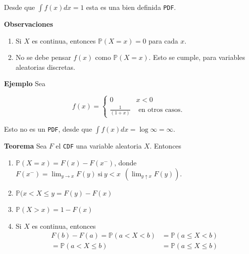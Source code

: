 \documentclass{article}\usepackage[]{graphicx}\usepackage[]{color}
\begin{document}
\vspace{0.2cm}

Desde que $\int f(x)dx = 1$ esta es una bien definida \texttt{PDF}.

\vspace{0.3cm}


\textbf{Observaciones}

\vspace{0.2cm}

\begin{enumerate}
\item Si $X$ es continua, entonces $\mathbb{P}(X =x) = 0$ para cada $x$. 
\item No se debe pensar $f(x)$ como $\mathbb{P}(X=x)$. Esto se cumple, para variables aleatorias discretas.
\end{enumerate}

\vspace{0.3cm}

\textbf{Ejemplo} Sea 

\[
f(x) = \begin{cases}
0 & x < 0\\
\frac{1}{(1 + x)} & \mbox{ en otros casos.}
\end{cases}
\]

\vspace{0.2cm}

Esto no es un \texttt{PDF}, desde que $\int f(x)dx = \log \infty = \infty$.

\vspace{0.3cm}

\textbf{Teorema} Sea $F$ el \texttt{CDF} una variable aleatoria $X$. Entonces

\begin{enumerate}
\item $\mathbb{P}(X =x) = F(x) - F(x^{-}) $, donde $F(x^{-}) = \lim_{y \rightarrow x}F(y) \  \mbox{si} \  y < x \ \ (\lim_{y \uparrow x}F(y))$.
\item $\mathbb{P}(x < X \leq y = F(y) -F(x)$
\item $\mathbb{P}(X > x) = 1-F(x)$
\item Si $X$ es continua, entonces
\begin{align*}
F(b) -F(a) = \mathbb{P}(a < X < b) &= \mathbb{P}(a \leq X < b)\\
 = \mathbb{P}(a < X \leq b) &=  \mathbb{P}(a \leq X \leq b)
\end{align*}
\end{enumerate}

\vspace{0.3cm}
\end{document}

